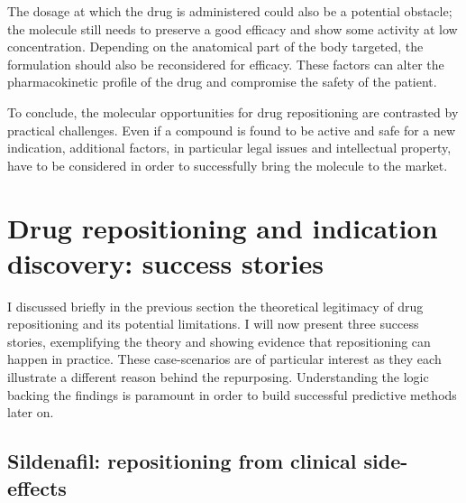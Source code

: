 The dosage at which the drug is administered could also be a potential obstacle; the molecule still needs to preserve a good efficacy and show some activity at low concentration. Depending on the anatomical part of the body targeted, the formulation should also be reconsidered for efficacy. These factors can alter the pharmacokinetic profile of the drug and compromise the safety of the patient.

To conclude, the molecular opportunities for drug repositioning are contrasted by practical challenges. Even if a compound is found to be active and safe for a new indication, additional factors, in particular legal issues and intellectual property, have to be considered in order to successfully bring the molecule to the market.

\section{Drug repositioning and indication discovery: success stories}

I discussed briefly in the previous section the theoretical legitimacy of drug repositioning and its potential limitations. I will now present three success stories, exemplifying the theory and showing evidence that repositioning can happen in practice. These case-scenarios are of particular interest as they each illustrate a different reason behind the repurposing. Understanding the logic backing the findings is paramount in order to build successful predictive methods later on.

\subsection{Sildenafil: repositioning from clinical side-effects}

